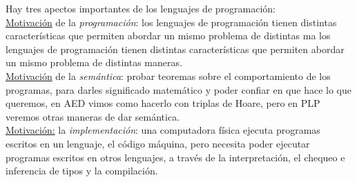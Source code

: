 \documentclass[12pt]{extarticle}
\begin{document}
Hay tres apectos importantes de los lenguajes de programación: \\
\underline{Motivación} de la \textit{programación}: los lenguajes de programación tienen distintas características que permiten abordar un mismo problema de distintas ma los lenguajes de programación tienen distintas características que permiten abordar un mismo problema de distintas maneras. \\
\underline{Motivación} de la \textit{semántica}: probar teoremas sobre el comportamiento de los programas, para darles significado matemático y poder confiar en que hace lo que queremos, en AED vimos como hacerlo con triplas de Hoare, pero en PLP veremos otras maneras de dar semántica. \\
\underline{Motivación:} la \textit{implementación}: una computadora física ejecuta programas escritos en un lenguaje, el código máquina, pero necesita poder ejecutar programas escritos en otros lenguajes, a través de la interpretación, el chequeo e inferencia de tipos y la compilación. \\

\end{document}
